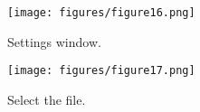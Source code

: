 \begin{figure}[H]
   \begin{center}
      \texttt{[image: figures/figure16.png]}
   \caption{Settings window.} 
	 \label{fig:16}
	 \end{center}
\end{figure}

\begin{figure}[H]
   \begin{center}
      \texttt{[image: figures/figure17.png]}
   \caption{Select the file.} 
	 \label{fig:17}
	 \end{center}
\end{figure}
